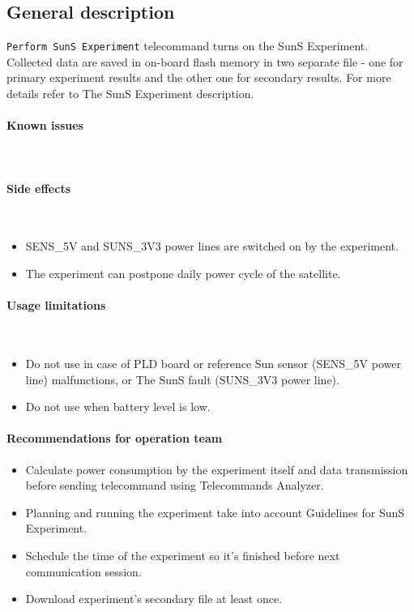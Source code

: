 

\subsection{General description}
\texttt{Perform SunS Experiment} telecommand turns on the SunS Experiment. Collected data are saved in on-board flash memory in two separate file - one for primary experiment results and the other one for secondary results. For more details refer to The SunS Experiment description.

\paragraph{Known issues} \mbox{} \\
\None

\paragraph{Side effects} \mbox{} \\
\begin{itemize}
    \item SENS_5V and SUNS_3V3 power lines are switched on by the experiment.
    \item The experiment can postpone daily power cycle of the satellite.
\end{itemize}


\paragraph{Usage limitations} \mbox{} \\
\begin{itemize}
    \item Do not use in case of PLD board or reference Sun sensor (SENS_5V power line) malfunctions, or The SunS fault (SUNS_3V3 power line).
    \item Do not use when battery level is low.
\end{itemize}

\paragraph{Recommendations for operation team}
\begin{itemize}
    \item Calculate power consumption by the experiment itself and data transmission before sending telecommand using Telecommands Analyzer.
    \item Planning and running the experiment take into account Guidelines for SunS Experiment.
    \item Schedule the time of the experiment so it's finished before next communication session.
    \item Download experiment's secondary file at least once.
\end{itemize}


